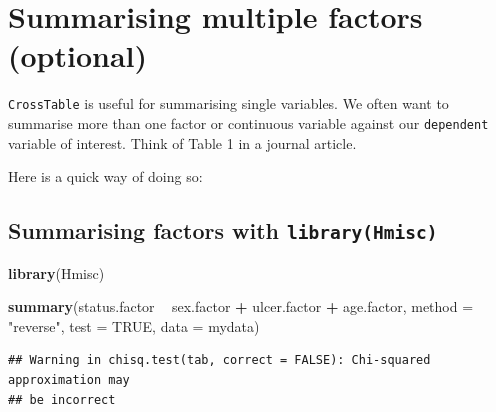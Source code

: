 \documentclass[]{book}
\makeatletter
\newenvironment{Shaded}{\begin{snugshade}}{\end{snugshade}}
\newcommand{\KeywordTok}[1]{\textcolor[rgb]{0.13,0.29,0.53}{\textbf{#1}}}
\newcommand{\DataTypeTok}[1]{\textcolor[rgb]{0.13,0.29,0.53}{#1}}
\newcommand{\StringTok}[1]{\textcolor[rgb]{0.31,0.60,0.02}{#1}}
\newcommand{\OtherTok}[1]{\textcolor[rgb]{0.56,0.35,0.01}{#1}}
\newcommand{\OperatorTok}[1]{\textcolor[rgb]{0.81,0.36,0.00}{\textbf{#1}}}
\newcommand{\NormalTok}[1]{#1}
\newenvironment{kframe}{%
\medskip{}
\setlength{\fboxsep}{.8em}
 \def\at@end@of@kframe{}%
 \ifinner\ifhmode%
  \def\at@end@of@kframe{\end{minipage}}%
  \begin{minipage}{\columnwidth}%
 \fi\fi%
 \def\FrameCommand##1{\hskip\@totalleftmargin \hskip-\fboxsep
 \colorbox{shadecolor}{##1}\hskip-\fboxsep
     \hskip-\linewidth \hskip-\@totalleftmargin \hskip\columnwidth}%
 \MakeFramed {\advance\hsize-\width
   \@totalleftmargin\z@ \linewidth\hsize
   \@setminipage}}%
 {\par\unskip\endMakeFramed%
 \at@end@of@kframe}
\renewenvironment{Shaded}{\begin{kframe}}{\end{kframe}}
\makeatother
\begin{document}
\section{Summarising multiple factors
(optional)}\label{summarising-multiple-factors-optional}

\texttt{CrossTable} is useful for summarising single variables. We often
want to summarise more than one factor or continuous variable against
our \texttt{dependent} variable of interest. Think of Table 1 in a
journal article.

Here is a quick way of doing so:

\subsection{\texorpdfstring{Summarising factors with
\texttt{library(Hmisc)}}{Summarising factors with library(Hmisc)}}\label{summarising-factors-with-libraryhmisc}

\begin{Shaded}
\begin{Highlighting}[]
\KeywordTok{library}\NormalTok{(Hmisc)}

\KeywordTok{summary}\NormalTok{(status.factor }\OperatorTok{~}\StringTok{ }\NormalTok{sex.factor }\OperatorTok{+}\StringTok{ }\NormalTok{ulcer.factor }\OperatorTok{+}\StringTok{ }\NormalTok{age.factor, }
                                             \DataTypeTok{method =} \StringTok{"reverse"}\NormalTok{, }
                                             \DataTypeTok{test   =} \OtherTok{TRUE}\NormalTok{,}
                                             \DataTypeTok{data   =}\NormalTok{ mydata)}
\end{Highlighting}
\end{Shaded}

\begin{verbatim}
## Warning in chisq.test(tab, correct = FALSE): Chi-squared approximation may
## be incorrect
\end{verbatim}
\end{document}
